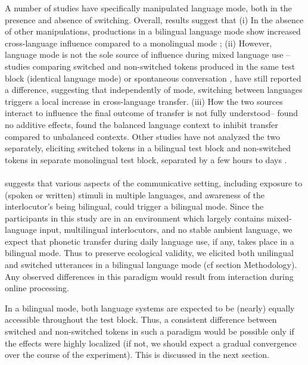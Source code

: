 \documentclass[11pt]{article}
\begin{document}
A number of studies have specifically manipulated language mode, both in the presence and absence of switching. Overall, results suggest that (i) In the absence of other manipulations, productions in a bilingual language mode show increased cross-language influence compared to a monolingual mode \cite{simonet2020increased,simonet2014phonetic}; (ii) However, language mode is not the sole source of influence during mixed language use -- studies comparing switched and non-switched tokens produced in the same test block (identical language mode) \cite{olson2016role,tsui2019impact} or spontaneous conversation \cite{piccinini2015voice}, have still reported a difference, suggesting that independently of mode, switching between languages triggers a local increase in cross-language transfer. (iii) How the two sources interact to influence the final outcome of transfer is not fully understood-- \cite{olson2016role} found no additive effects, \cite{olson2013bilingual} found the balanced language context to inhibit transfer compared to unbalanced contexts.  Other studies have not analyzed the two separately, eliciting switched tokens in a bilingual test block and non-switched tokens in separate monolingual test block, separated by a few hours to days \cite{schwartz2015language, bullock2009trying,antoniou2011inter, elias2017effects,vsimavckova2015immediate,vsimavckova2018patterns}.

\paragraph{} suggests that various aspects of the communicative setting, including exposure to (spoken or written) stimuli in multiple languages, and awareness of the interlocutor's being bilingual, could trigger a bilingual mode. Since the participants in this study are in an environment which largely contains mixed-language input, multilingual interlocutors, and no stable ambient language, we expect that phonetic transfer during daily language use, if any, takes place in a bilingual mode.  Thus to preserve ecological validity, we elicited both unilingual and switched utterances in a bilingual language mode (cf section Methodology). Any observed differences in this paradigm would result from interaction during online processing. 

In a bilingual mode, both language systems are expected to be (nearly) equally accessible throughout the test block. Thus, a consistent difference between switched and non-switched tokens in such a paradigm would be possible only if the effects were highly localized (if not, we should expect a gradual convergence over the course of the experiment). This is discussed in the next section.
\end{document}
